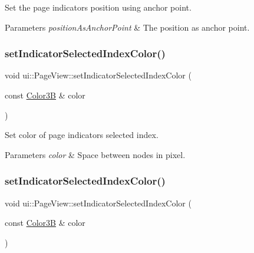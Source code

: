Set the page indicator\textquotesingle{}s position using anchor point. 


\begin{DoxyParams}{Parameters}
{\em position\+As\+Anchor\+Point} & The position as anchor point. \\
\hline
\end{DoxyParams}
\mbox{\label{classui_1_1PageView_a685219b0641c33d694fa5e89fd7f0e76}} 
\subsubsection{\texorpdfstring{set\+Indicator\+Selected\+Index\+Color()}{setIndicatorSelectedIndexColor()}\hspace{0.1cm}{\footnotesize\ttfamily [1/2]}}
{\footnotesize\ttfamily void ui\+::\+Page\+View\+::set\+Indicator\+Selected\+Index\+Color (\begin{DoxyParamCaption}\item[{const \hyperlink{structColor3B}{Color3B} \&}]{color }\end{DoxyParamCaption})}



Set color of page indicator\textquotesingle{}s selected index. 


\begin{DoxyParams}{Parameters}
{\em color} & Space between nodes in pixel. \\
\hline
\end{DoxyParams}
\mbox{\label{classui_1_1PageView_a685219b0641c33d694fa5e89fd7f0e76}} 
\subsubsection{\texorpdfstring{set\+Indicator\+Selected\+Index\+Color()}{setIndicatorSelectedIndexColor()}\hspace{0.1cm}{\footnotesize\ttfamily [2/2]}}
{\footnotesize\ttfamily void ui\+::\+Page\+View\+::set\+Indicator\+Selected\+Index\+Color (\begin{DoxyParamCaption}\item[{const \hyperlink{structColor3B}{Color3B} \&}]{color }\end{DoxyParamCaption})}



